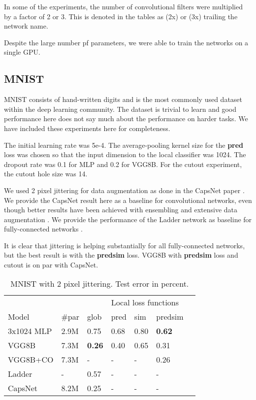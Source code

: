 \documentclass{article}
\begin{document}
In some of the experiments, the number of convolutional filters were multiplied by a factor of 2 or 3. This is denoted in the tables as (2x) or (3x) trailing the network name. 

Despite the large number pf parameters, we were able to train the networks on a single GPU.

\subsection{MNIST}

MNIST consists of hand-written digits and is the most commonly used dataset within the deep learning community. The dataset is trivial to learn and good performance here does not say much about the performance on harder tasks. We have included these experiments here for completeness. 

The initial learning rate was 5e-4. The average-pooling kernel size for the \textbf{pred} loss was chosen so that the input dimension to the local classifier was 1024. The dropout rate was 0.1 for MLP and 0.2 for VGG8B. For the cutout experiment, the cutout hole size was 14.

We used 2 pixel jittering for data augmentation as done in the CapsNet paper \cite{SabourFH17}. We provide the CapsNet result here as a baseline for convolutional networks, even though better results have been achieved with ensembling and extensive data augmentation \cite{WanZZLF13}.$  $ We provide the performance of the Ladder network as baseline for fully-connected networks \cite{RasmusBHVR15}.

It is clear that jittering is helping substantially for all fully-connected networks, but the best result is with the \textbf{predsim} loss. VGG8B with \textbf{predsim} loss and cutout is on par with CapsNet.

\begin{table}[h]
  \caption{MNIST with 2 pixel jittering. Test error in percent.}
  \label{table:mnist}
  \centering
  \begin{tabular}{lllllll}
    \toprule
    &&& \multicolumn{3}{|l}{Local loss functions} \\
    Model   & \#par & glob & \multicolumn{1}{|l}{pred} & sim & \multicolumn{1}{l}{predsim}  \\
    \midrule
    3x1024 MLP & 2.9M &  0.75 & \multicolumn{1}{|l}{0.68} & 0.80  & \textbf{0.62} \\
    VGG8B      & 7.3M &  \textbf{0.26} & \multicolumn{1}{|l}{0.40} & 0.65  & 0.31 \\
    VGG8B+CO      & 7.3M &  - & \multicolumn{1}{|l}{-} & - & 0.26 \\
    \midrule
    Ladder     & - & 0.57  & \multicolumn{1}{|l}{-} & - & - \\
    CapsNet    & 8.2M & 0.25  & \multicolumn{1}{|l}{-} & - & - \\
    \bottomrule
  \end{tabular}
\end{table}
\end{document}
